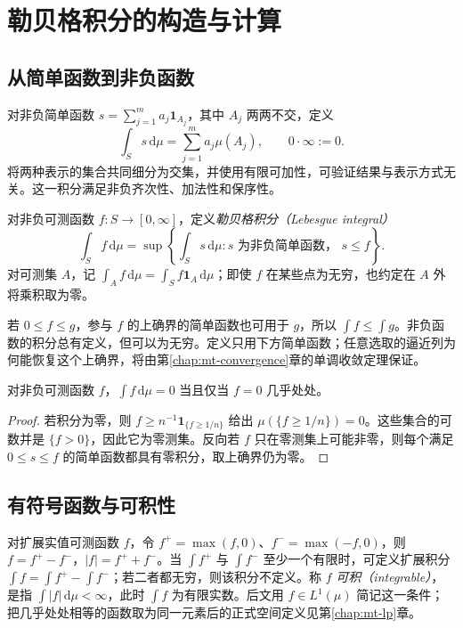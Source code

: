 \setcounter{chapter}{5} %
\chapter{勒贝格积分的构造与计算}
\label{chap:mt-integral}

\section{从简单函数到非负函数}
对非负简单函数 $s=\sum_{j=1}^{m}a_j\mathbf1_{A_j}$，其中 $A_j$ 两两不交，定义
\begin{equation}
 \int_Ss\,\mathrm d\mu=\sum_{j=1}^{m}a_j\mu(A_j),
 \qquad 0\cdot\infty:=0.
 \label{eq:mt-simple-integral}
\end{equation}
将两种表示的集合共同细分为交集，并使用有限可加性，可验证结果与表示方式无关。这一积分满足非负齐次性、加法性和保序性。

\begin{definition}
对非负可测函数 $f:S\to[0,\infty]$，定义\emph{勒贝格积分（Lebesgue integral）}
\begin{equation}
 \int_Sf\,\mathrm d\mu
 =\sup\left\{\int_Ss\,\mathrm d\mu:s\text{ 为非负简单函数， }s\leq f\right\}.
 \label{eq:mt-nonnegative-integral}
\end{equation}
对可测集 $A$，记 $\int_Af\,\mathrm d\mu=\int_Sf\mathbf1_A\,\mathrm d\mu$；即使 $f$ 在某些点为无穷，也约定在 $A$ 外将乘积取为零。
\end{definition}
若 $0\leq f\leq g$，参与 $f$ 的上确界的简单函数也可用于 $g$，所以 $\int f\leq\int g$。非负函数的积分总有定义，但可以为无穷。定义只用下方简单函数；任意选取的逼近列为何能恢复这个上确界，将由第\ref{chap:mt-convergence}章的单调收敛定理保证。

\begin{proposition}[零积分与几乎处处]
对非负可测函数 $f$，$\int f\,\mathrm d\mu=0$ 当且仅当 $f=0$ 几乎处处。
\label{prop:mt-zero-integral}
\end{proposition}
\begin{proof}
若积分为零，则 $f\geq n^{-1}\mathbf1_{\{f\geq1/n\}}$ 给出 $\mu(\{f\geq1/n\})=0$。这些集合的可数并是 $\{f>0\}$，因此它为零测集。反向若 $f$ 只在零测集上可能非零，则每个满足 $0\leq s\leq f$ 的简单函数都具有零积分，取上确界仍为零。
\end{proof}

\section{有符号函数与可积性}
对扩展实值可测函数 $f$，令 $f^+=\max(f,0)$、$f^-=\max(-f,0)$，则 $f=f^+-f^-$，$|f|=f^++f^-$。当 $\int f^+$ 与 $\int f^-$ 至少一个有限时，可定义扩展积分 $\int f=\int f^+-\int f^-$；若二者都无穷，则该积分不定义。称 $f$ \emph{可积（integrable）}，是指 $\int|f|\,\mathrm d\mu<\infty$，此时 $\int f$ 为有限实数。后文用 $f\in L^1(\mu)$ 简记这一条件；把几乎处处相等的函数取为同一元素后的正式空间定义见第\ref{chap:mt-lp}章。

